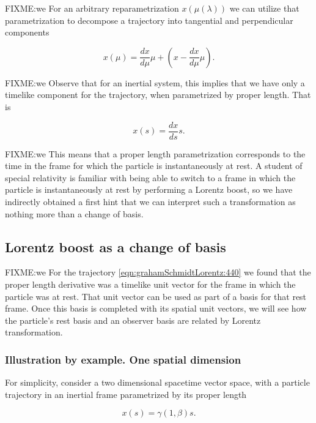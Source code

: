 FIXME:we
For an arbitrary reparametrization $x(\mu(\lambda))$ we can utilize that parametrization to decompose a trajectory into tangential and perpendicular components

\begin{equation}\label{eqn:grahamSchmidtLorentz:540}
x(\mu) = \frac{dx}{d\mu} \mu + \left( x - \frac{dx}{d\mu} \mu \right).
\end{equation}

FIXME:we
Observe that for an inertial system, this implies that we have only a timelike component for the trajectory, when parametrized by proper length.  That is

\begin{equation}\label{eqn:grahamSchmidtLorentz:580}
x(s) = \frac{dx}{ds} s.
\end{equation}

FIXME:we
This means that a proper length parametrization corresponds to the time in the frame for which the particle is instantaneously at rest.  A student of special relativity is familiar with being able to switch to a frame in which the particle is instantaneously at rest by performing a Lorentz boost, so we have indirectly obtained a first hint that we can interpret such a transformation as nothing more than a change of basis.

\subsection{Lorentz boost as a change of basis}

FIXME:we
For the trajectory \ref{eqn:grahamSchmidtLorentz:440} we found that the proper length derivative was a timelike unit vector for the frame in which the particle was at rest.  That unit vector can be used as part of a basis for that rest frame.  Once this basis is completed with its spatial unit vectors, we will see how the particle's rest basis and an observer basis are related by Lorentz transformation.

\subsubsection{Illustration by example.  One spatial dimension}

For simplicity, consider a two dimensional spacetime vector space, with a particle trajectory in an inertial frame parametrized by its proper length

\begin{equation}\label{eqn:grahamSchmidtLorentz:600}
x(s) = \gamma (1, \beta) s.
\end{equation}

